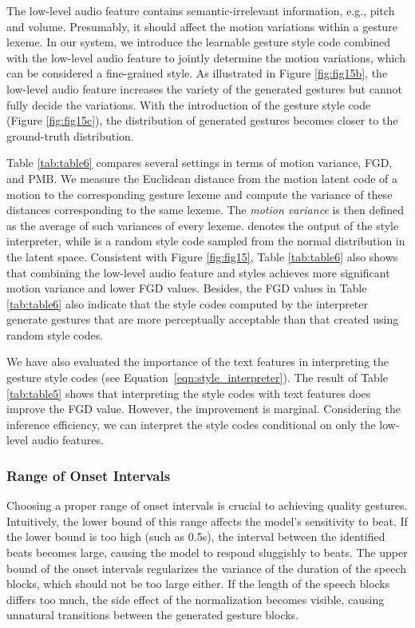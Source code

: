 \documentclass[acmtog,authorversion]{acmart}
\newcommand{\eqn}{Equation{}~}
\begin{document}
The low-level audio feature  contains semantic-irrelevant information, e.g., pitch and volume. Presumably, it should affect the motion variations within a gesture lexeme. In our system, we introduce the learnable gesture style code  combined with the low-level audio feature to jointly determine the motion variations, which can be considered a fine-grained style.
As illustrated in Figure \ref{fig:fig15b}, the low-level audio feature increases the variety of the generated gestures but cannot fully decide the variations. With the introduction of the gesture style code (Figure \ref{fig:fig15c}), the distribution of generated gestures becomes closer to the ground-truth distribution. 

Table \ref{tab:table6} compares several settings in terms of motion variance, FGD, and PMB. We measure the Euclidean distance from the motion latent code of a motion to the corresponding gesture lexeme and compute the variance of these distances corresponding to the same lexeme. The \emph{motion variance} is then defined as the average of such variances of every lexeme.  denotes the output of the style interpreter, while  is a random style code sampled from the normal distribution in the latent space. Consistent with Figure \ref{fig:fig15}, Table \ref{tab:table6} also shows that combining the low-level audio feature and styles achieves more significant motion variance and lower FGD values. Besides, the FGD values in Table \ref{tab:table6} also indicate that the style codes computed by the interpreter generate gestures that are more perceptually acceptable than that created using random style codes.

We have also evaluated the importance of the text features in interpreting the gesture style codes (see \eqn\ref{eqn:style_interpreter}).
The result of Table \ref{tab:table5} shows that interpreting the style codes 
with text features does improve the FGD value. However, the improvement is marginal. Considering the inference efficiency, we can interpret the style codes conditional on only the low-level audio features.

\subsubsection{Range of Onset Intervals}
\label{subsubsec:onset_interval}
Choosing a proper range of onset intervals is crucial to achieving quality gestures. Intuitively, the lower bound of this range affects the model's sensitivity to beat. If the lower bound is too high (such as 0.5s), the interval between the identified beats becomes large, causing the model to respond sluggishly to beats. The upper bound of the onset intervals regularizes the variance of the duration of the speech blocks, which should not be too large either. If the length of the speech blocks differs too much, the side effect of the normalization becomes visible, causing unnatural transitions between the generated gesture blocks. 
\end{document}
